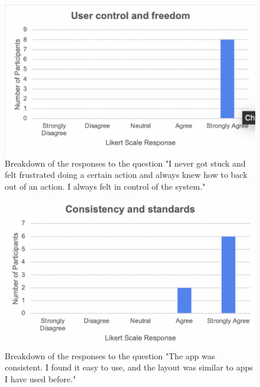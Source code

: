 \documentclass{l4proj}
\begin{document}
\begin{appendices}
\begin{figure}[H]
    \begin{centering}
    \includegraphics[scale=0.5]{images/heuristic3.pdf}
    \caption{Breakdown of the responses to the question "I never got stuck and felt frustrated doing a certain action and always knew how to back out of an action. I always felt in control of the system."}
    \label{fig: heuristic3}
    \end{centering}
\end{figure}

\begin{figure}[H]
    \begin{centering}
    \includegraphics[scale=0.5]{images/heuristic4.pdf}
    \caption{Breakdown of the responses to the question "The app was consistent. I found it easy to use, and the layout was similar to apps I have used before."}
    \label{fig: heuristic4}
    \end{centering}
\end{figure}


\end{appendices}
\end{document}
